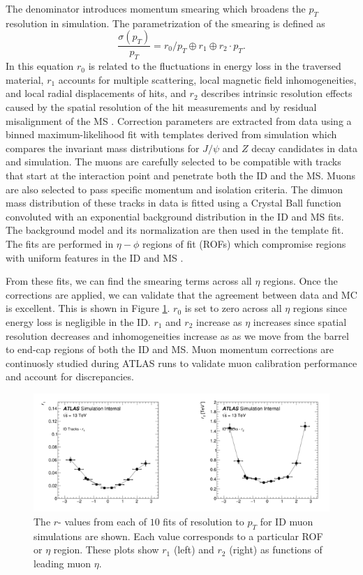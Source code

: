 The denominator introduces momentum smearing which broadens the $p_T$ resolution in simulation. The parametrization of the smearing is defined as
\begin{equation}
    \frac{\sigma(p_T)}{p_T} = r_0/p_T \oplus r_1 \oplus r_2 \cdot p_T .
\end{equation}
In this equation $r_0$ is related to the fluctuations in energy loss in the traversed material, $r_1$ accounts for multiple scattering, local magnetic field inhomogeneities, and local radial displacements of hits, and $r_2$ describes intrinsic resolution effects caused by the spatial resolution of the hit measurements and by residual misalignment of the MS \cite{MCPpaper}. 
Correction parameters are extracted from data using a binned maximum-likelihood fit with templates derived from simulation which compares the invariant mass distributions for $J/\psi$ and $Z$ decay candidates in data and simulation. The muons are carefully selected to be compatible with tracks that start at the interaction point and penetrate both the ID and the MS. Muons are also selected to pass specific momentum and isolation criteria. The dimuon mass distribution of these tracks in data is fitted using a Crystal Ball function convoluted with an exponential background distribution in the ID and MS fits. The background model and its normalization are then used in the template fit. The fits are performed in $\eta-\phi$ regions of fit (ROFs) which compromise regions with uniform features in the ID and MS \cite{MCPpaper}. 

From these fits, we can find the smearing terms across all $\eta$ regions. Once the corrections are applied, we can validate that the agreement between data and MC is excellent. This is shown in Figure \ref{fig:parametrizationeta}. $r_0$ is set to zero across all $\eta$ regions since energy loss is negligible in the ID. $r_1$ and $r_2$ increase as $\eta$ increases since spatial resolution decreases and inhomogeneities increase as as we move from the barrel to end-cap regions of both the ID and MS. Muon momentum corrections are continuosly studied during ATLAS runs to validate muon calibration performance and account for discrepancies.

\begin{figure}[!h]
	\centering 
    \includegraphics[width=.85\textwidth]{Pictures/parametrizationIDeta.PNG}
    \caption{ The $r$- values from each of $10$ fits of resolution to $p_T$ for ID muon simulations are shown. Each value corresponds to a particular ROF or $\eta$ region. These plots show $r_1$ (left) and $r_2$  (right) as functions of leading muon $\eta$.}
    \label{fig:parametrizationeta}
\end{figure}

